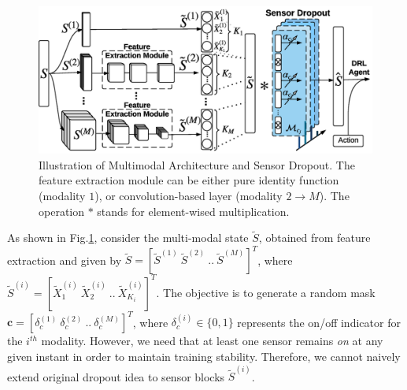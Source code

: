 \documentclass[../thesis.tex]{subfiles}
\begin{document}
\begin{figure}[t]
\begin{center}
\centerline{\includegraphics[width=\columnwidth,trim= 0 850 1020 30, clip=true]{./MultimodalDRL/fig/sd}}
\caption{Illustration of Multimodal Architecture and Sensor Dropout. The feature extraction module can be either pure identity function (modality $1$), or convolution-based layer (modality $2 \to M$). The operation $*$ stands for element-wised multiplication.}
\label{fig:Multi-SD}
\end{center}
\end{figure} 




As shown in Fig.\ref{fig:Multi-SD}, consider the multi-modal state $\tilde{S}$, obtained from feature extraction and given by $\tilde{S}=[\tilde{S}^{(1)}~\tilde{S}^{(2)}~..~\tilde{S}^{(M)}]^T$, where $\tilde{S}^{(i)}= [\tilde{X}_1^{(i)}~\tilde{X}_2^{(i)}~..~\tilde{X}_{K_i}^{(i)}]^T$. 
The objective is to generate a random mask
$\mathbf{c} = [\delta_{c}^{(1)}~\delta_{c}^{(2)}~..~\delta_{c}^{(M)}]^T$, where $\delta_{c}^{(i)} \in \{0,1\}$ represents the on/off indicator for the $i^{th}$ modality.
However, we need that at least one sensor remains \emph{on} at any given instant in order to maintain training stability. Therefore, we cannot naively extend original dropout idea to sensor blocks $\tilde{S}^{(i)}$.
\end{document}
